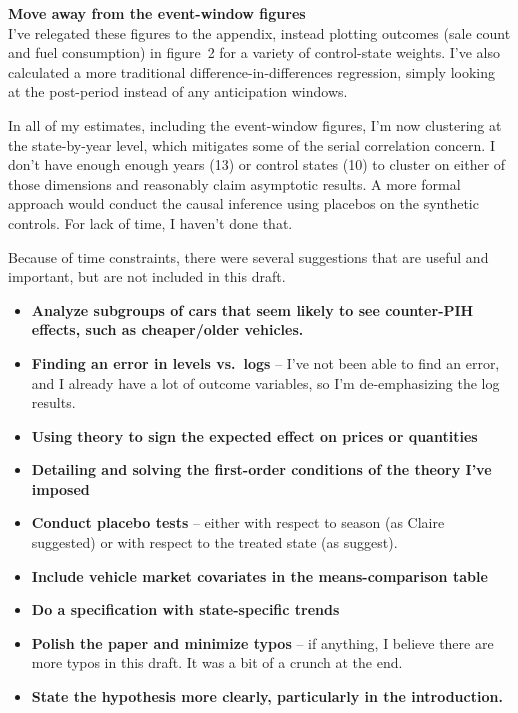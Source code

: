 \documentclass[12pt,letterpaper,oneside]{article}
\begin{document}
\textbf{Move away from the event-window figures}\\
I've relegated these figures to the appendix, instead plotting outcomes (sale count and fuel consumption) in figure~2 for a variety of control-state weights.
I've also calculated a more traditional difference-in-differences regression, simply looking at the post-period instead of any anticipation windows.

In all of my estimates, including the event-window figures, I'm now clustering at the state-by-year level, which mitigates some of the serial correlation concern.
I don't have enough enough years (13) or control states (10) to cluster on either of those dimensions and reasonably claim asymptotic results.
A more formal approach would conduct the causal inference using placebos on the synthetic controls. For lack of time, I haven't done that.




\vspace{2\baselineskip}
Because of time constraints, there were several suggestions that are useful and important, but are not included in this draft.
\begin{itemize}
    \item \textbf{Analyze subgroups of cars that seem likely to see counter-PIH effects, such as cheaper/older vehicles.}
    \item \textbf{Finding an error in levels vs.\ logs} -- I've not been able to find an error, and I already have a lot of outcome variables, so I'm de-emphasizing the log results.
    \item \textbf{Using theory to sign the expected effect on prices or quantities}
    \item \textbf{Detailing and solving the first-order conditions of the theory I've imposed}
    \item \textbf{Conduct placebo tests} -- either with respect to season (as Claire suggested) or with respect to the treated state (as \cite{abadie2010synthetic} suggest).
    \item \textbf{Include vehicle market covariates in the means-comparison table}
    \item \textbf{Do a specification with state-specific trends}
    \item \textbf{Polish the paper and minimize typos} -- if anything, I believe there are more typos in this draft.  It was a bit of a crunch at the end.
    \item \textbf{State the hypothesis more clearly, particularly in the introduction.}
\end{itemize}
\end{document}
